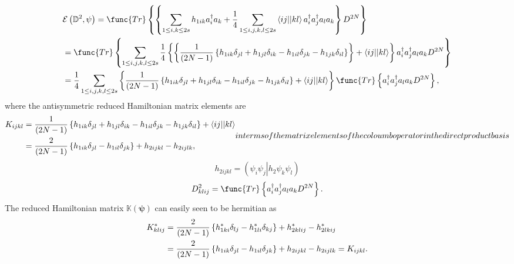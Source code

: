 \documentclass[aps,preprint]{revtex4}
\begin{document}
\begin{align}
& \mathcal{E}\left( \mathbb{D}^{2},\mathbf{\psi }\right) =\func{Tr}\left\{
\left\{ \sum_{1\leq i,k\leq 2s}h_{1ik}a_{i}^{\dagger }a_{k}+\frac{1}{4}%
\sum_{1\leq i,j,k,l\leq 2s}\left\langle ij||kl\right\rangle a_{i}^{\dagger
}a_{j}^{\dagger }a_{l}a_{k}\right\} D^{2N}\right\}  \\
& =\func{Tr}\left\{ \sum_{1\leq i,j,k,l\leq 2s}\frac{1}{4}\left\{ \left\{ 
\frac{1}{\left( 2N-1\right) }\left\{ h_{1ik}\delta _{jl}+h_{1jl}\delta
_{ik}-h_{1il}\delta _{jk}-h_{1jk}\delta _{il}\right\} \right\} +\left\langle
ij||kl\right\rangle \right\} a_{i}^{\dagger }a_{j}^{\dagger
}a_{l}a_{k}D^{2N}\right\}   \notag \\
& =\frac{1}{4}\sum_{1\leq i,j,k,l\leq 2s}\left\{ \frac{1}{\left( 2N-1\right) 
}\left\{ h_{1ik}\delta _{jl}+h_{1jl}\delta _{ik}-h_{1il}\delta
_{jk}-h_{1jk}\delta _{il}\right\} +\left\langle ij||kl\right\rangle \right\} 
\func{Tr}\left\{ a_{i}^{\dagger }a_{j}^{\dagger }a_{l}a_{k}D^{2N}\right\} ,
\end{align}%
where the antisymmetric reduced Hamiltonian matrix elements are 
\begin{subequations}
\begin{align}
K_{ijkl}& =\frac{1}{\left( 2N-1\right) }\left\{ h_{1ik}\delta
_{jl}+h_{1jl}\delta _{ik}-h_{1il}\delta _{jk}-h_{1jk}\delta _{il}\right\}
+\left\langle ij||kl\right\rangle   \notag \\
& =\frac{2}{\left( 2N-1\right) }\left\{ h_{1ik}\delta _{jl}-h_{1il}\delta
_{jk}\right\} +h_{2ijkl}-h_{2ijlk},
\end{align}%
in terms of the matrix elements of the coloumb operator in the direct
product basis 
\end{subequations}
\begin{equation}
h_{2ijkl}=\left( \left. \psi _{i}\psi _{j}\right\vert h_{2}\psi _{k}\psi
_{l}\right) 
\end{equation}%
\begin{equation}
D_{klij}^{2}=\func{Tr}\left\{ a_{i}^{\dagger }a_{j}^{\dagger
}a_{l}a_{k}D^{2N}\right\} .
\end{equation}%
The reduced Hamiltonian matrix $\mathbb{K}\left( \mathbf{\psi }\right) $ can
easily seen to be hermitian as 
\begin{align}
K_{klij}^{\ast }& =\frac{2}{\left( 2N-1\right) }\left\{ h_{1ki}^{\ast
}\delta _{lj}-h_{1li}^{\ast }\delta _{kj}\right\} +h_{2klij}^{\ast
}-h_{2lkij}^{\ast }  \notag \\
& =\frac{2}{\left( 2N-1\right) }\left\{ h_{1ik}\delta _{jl}-h_{1il}\delta
_{jk}\right\} +h_{2ijkl}-h_{2ijlk}=K_{ijkl}.
\end{align}%
\end{document}

